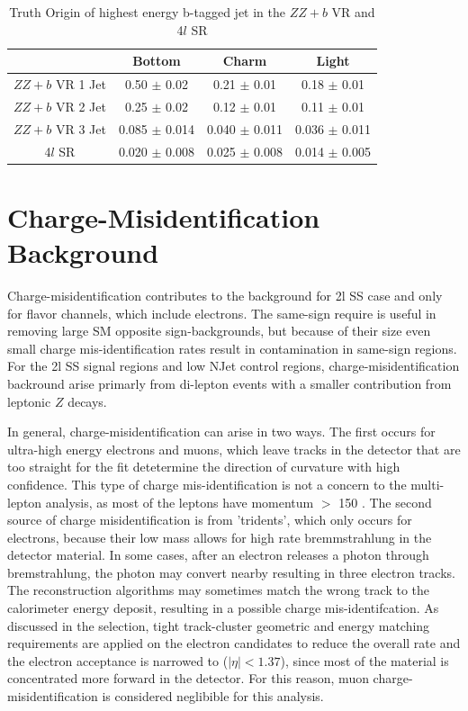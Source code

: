 \begin{table}[htbp]
\centering 
\begin{tabular}{|c|c|c|c|} 
  \hline
                 & Bottom      & Charm       & Light \\
  \hline
  $ZZ+b$ VR 1 Jet& 0.50  $\pm$ 0.02  & 0.21  $\pm$ 0.01  & 0.18  $\pm$ 0.01 \\ 
  $ZZ+b$ VR 2 Jet& 0.25  $\pm$ 0.02  & 0.12  $\pm$ 0.01  & 0.11  $\pm$ 0.01 \\ 
  $ZZ+b$ VR 3 Jet& 0.085 $\pm$ 0.014 & 0.040 $\pm$ 0.011 & 0.036 $\pm$ 0.011 \\
  4$l$ SR        & 0.020 $\pm$ 0.008 & 0.025 $\pm$ 0.008 & 0.014 $\pm$ 0.005 \\
  \hline 
\end{tabular}
\caption{Truth Origin of highest energy b-tagged jet in the $ZZ+b$ VR and 4$l$ SR} 
\label{table:zz_truth}
\end{table} 


\section{Charge-Misidentification Background }

Charge-misidentification contributes to the background for 2l SS case and only for flavor channels, which include electrons. The same-sign require is useful in removing large SM opposite sign-backgrounds, but because of their size even small charge mis-identification rates result in contamination in same-sign regions. For the 2l SS signal regions and low NJet control regions, charge-misidentification backround arise primarly from \ttbar di-lepton events with a smaller contribution from leptonic $Z$ decays. 

In general, charge-misidentification can arise in two ways. The first occurs for ultra-high energy electrons and muons, which leave tracks in the detector that are too straight for the fit detetermine the direction of curvature with high confidence. This type of charge mis-identification is not a concern to the \tth multi-lepton analysis, as most of the leptons have momentum $>$ 150 \gevc. The second source of charge misidentification is from 'tridents', which only occurs for electrons, because their low mass allows for high rate bremmstrahlung in the detector material. In some cases, after an electron releases a photon through bremstrahlung, the photon may convert nearby resulting in three electron tracks. The reconstruction algorithms may sometimes match the wrong track to the calorimeter energy deposit, resulting in a possible charge mis-identifcation. As discussed in the selection, tight track-cluster geometric and energy matching requirements are applied on the electron candidates to reduce the overall rate and the electron acceptance is narrowed to ($|\eta| < 1.37$), since most of the material is concentrated more forward in the detector. For this reason, muon charge-misidentification is considered neglibible for this analysis.

